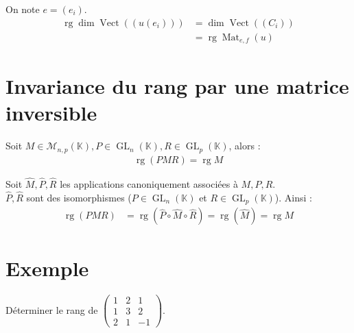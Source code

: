 \documentclass[../main.tex]{subfiles}
\begin{document}
On note $e = (e_i)$. 
\begin{align*}
    \operatorname{rg} \dim \operatorname{Vect}((u(e_i)))
    &= \dim \operatorname{Vect} ((C_i)) \\
    &= \operatorname{rg} \operatorname{Mat}_{e,f}(u)
\end{align*}

\section{Invariance du rang par une matrice inversible}
\begin{tcolorbox}[title=Propostion 28.35, title filled=false, colframe=lightblue, colback=lightblue!10!white]
    Soit $M\in \mathcal{M}_{n,p}(\mathbb{K}), P\in \operatorname{GL}_n(\mathbb{K}), R\in \operatorname{GL}_p(\mathbb{K})$, alors : 
    \begin{align*}
        \operatorname{rg}(PMR) = \operatorname{rg} M
    \end{align*}
\end{tcolorbox}

\noindent Soit $\hat M, \hat P, \hat R$ les applications canoniquement associées à $M, P, R$. \\
$\hat P, \hat R$ sont des isomorphismes ($P\in \operatorname{GL}_n(\mathbb{K})$ et $R\in \operatorname{GL}_p(\mathbb{K})$). Ainsi :
\begin{align*}
    \operatorname{rg} (PMR) &= \operatorname{rg} (\hat P\circ \hat M\circ \hat R) = \operatorname{rg} (\hat M) = \operatorname{rg} M
\end{align*}

\section{Exemple}
\begin{tcolorbox}[title=Exemple 28.37, title filled=false, colframe=darkgreen, colback=darkgreen!10!white]
    Déterminer le rang de $\begin{pmatrix}
        1 & 2 & 1 \\
        1 & 3 & 2 \\
        2 & 1 & -1
    \end{pmatrix}$. 
\end{tcolorbox}
\end{document}
